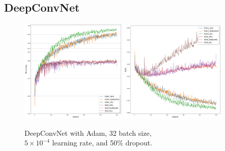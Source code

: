 \subsection{DeepConvNet}\label{results-deepconvnet}
	\begin{figure}[H]
		\centering
		\includegraphics[width=0.45\textwidth]{results/deepconvnet_adam_32_0.0005_0.5_acc.png}
		\includegraphics[width=0.45\textwidth]{results/deepconvnet_adam_32_0.0005_0.5_loss.png}
		\caption{DeepConvNet with Adam, 32 batch size, \\ $5 \times 10^{-4}$ learning rate, and 50\% dropout.}
	\end{figure}

